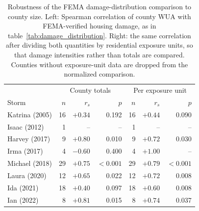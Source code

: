 \begin{table}[htb!]
\centering
\caption{Robustness of the FEMA damage-distribution comparison to
county size. Left: Spearman correlation of county WUA with FEMA-verified
housing damage, as in table~\ref{tab:damage_distribution}. Right: the
same correlation after dividing both quantities by residential exposure
units, so that damage intensities rather than totals are compared.
Counties without exposure-unit data are dropped from the normalized
comparison.}
\label{tab:damage_normalized}
\begin{tabular}{lrrrrrr}
\hline
 & \multicolumn{3}{c}{County totals} & \multicolumn{3}{c}{Per exposure unit} \\
Storm & $n$ & $r_s$ & $p$ & $n$ & $r_s$ & $p$ \\
\hline
Katrina (2005) & 16 & $+0.34$ & 0.192 & 16 & $+0.44$ & 0.090 \\
Isaac (2012) & 1 & -- & -- & 1 & -- & -- \\
Harvey (2017) & 9 & $+0.80$ & 0.010 & 9 & $+0.72$ & 0.030 \\
Irma (2017) & 4 & $-0.60$ & 0.400 & 4 & $+1.00$ & -- \\
Michael (2018) & 29 & $+0.75$ & $<0.001$ & 29 & $+0.79$ & $<0.001$ \\
Laura (2020) & 12 & $+0.65$ & 0.022 & 12 & $+0.72$ & 0.008 \\
Ida (2021) & 18 & $+0.40$ & 0.097 & 18 & $+0.60$ & 0.008 \\
Ian (2022) & 8 & $+0.81$ & 0.015 & 8 & $+0.74$ & 0.037 \\
\hline
\end{tabular}
\end{table}
